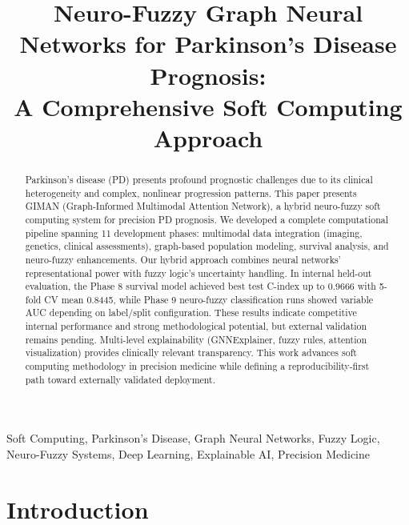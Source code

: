 \documentclass[conference]{IEEEtran}
\begin{document}
\title{Neuro-Fuzzy Graph Neural Networks for Parkinson's Disease Prognosis:\\A Comprehensive Soft Computing Approach}

\author{
}

\maketitle

\begin{abstract}
Parkinson's disease (PD) presents profound prognostic challenges due to its clinical heterogeneity and complex, nonlinear progression patterns. This paper presents GIMAN (Graph-Informed Multimodal Attention Network), a hybrid neuro-fuzzy soft computing system for precision PD prognosis. We developed a complete computational pipeline spanning 11 development phases: multimodal data integration (imaging, genetics, clinical assessments), graph-based population modeling, survival analysis, and neuro-fuzzy enhancements. Our hybrid approach combines neural networks' representational power with fuzzy logic's uncertainty handling. In internal held-out evaluation, the Phase 8 survival model achieved best test C-index up to 0.9666 with 5-fold CV mean 0.8445, while Phase 9 neuro-fuzzy classification runs showed variable AUC depending on label/split configuration. These results indicate competitive internal performance and strong methodological potential, but external validation remains pending. Multi-level explainability (GNNExplainer, fuzzy rules, attention visualization) provides clinically relevant transparency. This work advances soft computing methodology in precision medicine while defining a reproducibility-first path toward externally validated deployment.
\end{abstract}

\begin{IEEEkeywords}
Soft Computing, Parkinson's Disease, Graph Neural Networks, Fuzzy Logic, Neuro-Fuzzy Systems, Deep Learning, Explainable AI, Precision Medicine
\end{IEEEkeywords}

\section{Introduction}
\end{document}
